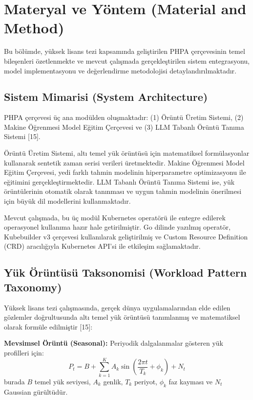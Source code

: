 \documentclass[12pt,a4paper]{article}
\begin{document}
\section{Materyal ve Yöntem (Material and Method)}

Bu bölümde, yüksek lisans tezi kapsamında geliştirilen PHPA çerçevesinin temel bileşenleri özetlenmekte ve mevcut çalışmada gerçekleştirilen sistem entegrasyonu, model implementasyonu ve değerlendirme metodolojisi detaylandırılmaktadır.

\subsection{Sistem Mimarisi (System Architecture)}

PHPA çerçevesi üç ana modülden oluşmaktadır: (1) Örüntü Üretim Sistemi, (2) Makine Öğrenmesi Model Eğitim Çerçevesi ve (3) LLM Tabanlı Örüntü Tanıma Sistemi [15].

Örüntü Üretim Sistemi, altı temel yük örüntüsü için matematiksel formülasyonlar kullanarak sentetik zaman serisi verileri üretmektedir. Makine Öğrenmesi Model Eğitim Çerçevesi, yedi farklı tahmin modelinin hiperparametre optimizasyonu ile eğitimini gerçekleştirmektedir. LLM Tabanlı Örüntü Tanıma Sistemi ise, yük örüntülerinin otomatik olarak tanınması ve uygun tahmin modelinin önerilmesi için büyük dil modellerini kullanmaktadır.

Mevcut çalışmada, bu üç modül Kubernetes operatörü ile entegre edilerek operasyonel kullanıma hazır hale getirilmiştir. Go dilinde yazılmış operatör, Kubebuilder v3 çerçevesi kullanılarak geliştirilmiş ve Custom Resource Definition (CRD) aracılığıyla Kubernetes API'si ile etkileşim sağlamaktadır.

\subsection{Yük Örüntüsü Taksonomisi (Workload Pattern Taxonomy)}

Yüksek lisans tezi çalışmasında, gerçek dünya uygulamalarından elde edilen gözlemler doğrultusunda altı temel yük örüntüsü tanımlanmış ve matematiksel olarak formüle edilmiştir [15]:

\textbf{Mevsimsel Örüntü (Seasonal):} Periyodik dalgalanmalar gösteren yük profilleri için:
\begin{equation}
P_t = B + \sum_{k=1}^{K} A_k \sin\left(\frac{2\pi t}{T_k} + \phi_k\right) + N_t
\end{equation}
burada $B$ temel yük seviyesi, $A_k$ genlik, $T_k$ periyot, $\phi_k$ faz kayması ve $N_t$ Gaussian gürültüdür.
\end{document}
